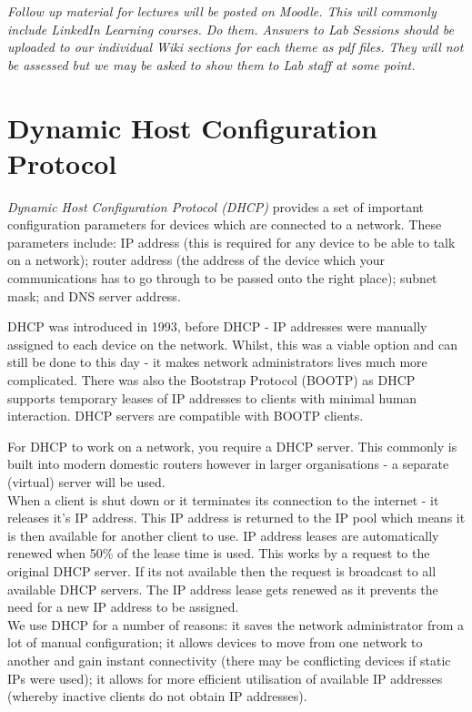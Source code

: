 
\textit{Follow up material for lectures will be posted on Moodle. This will commonly include LinkedIn Learning courses. Do them. Answers to Lab Sessions should be uploaded to our individual Wiki sections for each theme as pdf files. They will not be assessed but we may be asked to show them to Lab staff at some point.}

\section{Dynamic Host Configuration Protocol}
\textit{Dynamic Host Configuration Protocol (DHCP)} provides a set of important configuration parameters for devices which are connected to a network. These parameters include: IP address (this is required for any device to be able to talk on a network); router address (the address of the device which your communications has to go through to be passed onto the right place); subnet mask; and DNS server address.\nl

DHCP was introduced in 1993, before DHCP - IP addresses were manually assigned to each device on the network. Whilst, this was a viable option and can still be done to this day - it makes network administrators lives much more complicated. There was also the Bootstrap Protocol (BOOTP) as DHCP supports temporary leases of IP addresses to clients with minimal human interaction. DHCP servers are compatible with BOOTP clients.\nl

For DHCP to work on a network, you require a DHCP server. This commonly is built into modern domestic routers however in larger organisations - a separate (virtual) server will be used.\\

When a client is shut down or it terminates its connection to the internet - it releases it's IP address. This IP address is returned to the IP pool which means it is then available for another client to use. IP address leases are automatically renewed when 50\% of the lease time is used. This works by a request to the original DHCP server. If its not available then the request is broadcast to all available DHCP servers. The IP address lease gets renewed as it prevents the need for a new IP address to be assigned.\\

We use DHCP for a number of reasons: it saves the network administrator from a lot of manual configuration; it allows devices to move from one network to another and gain instant connectivity (there may be conflicting devices if static IPs were used); it allows for more efficient utilisation of available IP addresses (whereby inactive clients do not obtain IP addresses).\\

